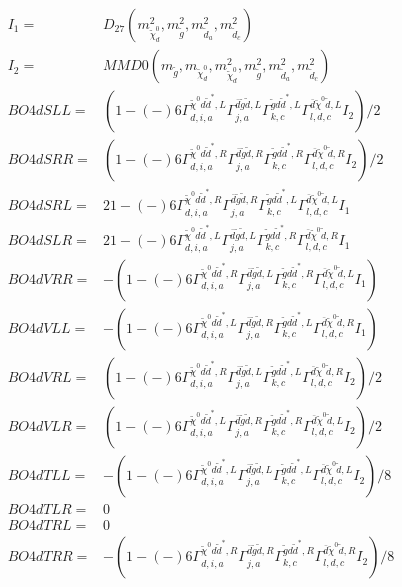 \documentclass[A4,landscape]{article}
\begin{document}
\begin{align} 
I_1 = & D_{27}(m^2_{\tilde{\chi}^0_{{d}}}, m^2_{\tilde{g}}, m^2_{\tilde{d}_{{a}}}, m^2_{\tilde{d}_{{c}}}) \\ 
I_2 = & MMD0(m_{\tilde{g}}, m_{\tilde{\chi}^0_{{d}}}, m^2_{\tilde{\chi}^0_{{d}}}, m^2_{\tilde{g}}, m^2_{\tilde{d}_{{a}}}, m^2_{\tilde{d}_{{c}}}) \\ 
  BO4dSLL= & (  1
-(-)
  6 \Gamma^{\tilde{\chi}^0 d \tilde{d}^*,L}_{d, i, a} \Gamma^{\bar{d}\tilde{g} \tilde{d} ,L}_{j, a} \Gamma^{\tilde{g} d \tilde{d}^*,L}_{k, c} \Gamma^{\bar{d}\tilde{\chi}^0 \tilde{d} ,L}_{l, d, c} I_2)/2 \\ 
  BO4dSRR= & (  1
-(-)
  6 \Gamma^{\tilde{\chi}^0 d \tilde{d}^*,R}_{d, i, a} \Gamma^{\bar{d}\tilde{g} \tilde{d} ,R}_{j, a} \Gamma^{\tilde{g} d \tilde{d}^*,R}_{k, c} \Gamma^{\bar{d}\tilde{\chi}^0 \tilde{d} ,R}_{l, d, c} I_2)/2 \\ 
  BO4dSRL= & 2   1
-(-)
  6 \Gamma^{\tilde{\chi}^0 d \tilde{d}^*,R}_{d, i, a} \Gamma^{\bar{d}\tilde{g} \tilde{d} ,R}_{j, a} \Gamma^{\tilde{g} d \tilde{d}^*,L}_{k, c} \Gamma^{\bar{d}\tilde{\chi}^0 \tilde{d} ,L}_{l, d, c} I_1 \\ 
  BO4dSLR= & 2   1
-(-)
  6 \Gamma^{\tilde{\chi}^0 d \tilde{d}^*,L}_{d, i, a} \Gamma^{\bar{d}\tilde{g} \tilde{d} ,L}_{j, a} \Gamma^{\tilde{g} d \tilde{d}^*,R}_{k, c} \Gamma^{\bar{d}\tilde{\chi}^0 \tilde{d} ,R}_{l, d, c} I_1 \\ 
  BO4dVRR= & -(  1
-(-)
  6 \Gamma^{\tilde{\chi}^0 d \tilde{d}^*,R}_{d, i, a} \Gamma^{\bar{d}\tilde{g} \tilde{d} ,L}_{j, a} \Gamma^{\tilde{g} d \tilde{d}^*,R}_{k, c} \Gamma^{\bar{d}\tilde{\chi}^0 \tilde{d} ,L}_{l, d, c} I_1) \\ 
  BO4dVLL= & -(  1
-(-)
  6 \Gamma^{\tilde{\chi}^0 d \tilde{d}^*,L}_{d, i, a} \Gamma^{\bar{d}\tilde{g} \tilde{d} ,R}_{j, a} \Gamma^{\tilde{g} d \tilde{d}^*,L}_{k, c} \Gamma^{\bar{d}\tilde{\chi}^0 \tilde{d} ,R}_{l, d, c} I_1) \\ 
  BO4dVRL= & (  1
-(-)
  6 \Gamma^{\tilde{\chi}^0 d \tilde{d}^*,R}_{d, i, a} \Gamma^{\bar{d}\tilde{g} \tilde{d} ,L}_{j, a} \Gamma^{\tilde{g} d \tilde{d}^*,L}_{k, c} \Gamma^{\bar{d}\tilde{\chi}^0 \tilde{d} ,R}_{l, d, c} I_2)/2 \\ 
  BO4dVLR= & (  1
-(-)
  6 \Gamma^{\tilde{\chi}^0 d \tilde{d}^*,L}_{d, i, a} \Gamma^{\bar{d}\tilde{g} \tilde{d} ,R}_{j, a} \Gamma^{\tilde{g} d \tilde{d}^*,R}_{k, c} \Gamma^{\bar{d}\tilde{\chi}^0 \tilde{d} ,L}_{l, d, c} I_2)/2 \\ 
  BO4dTLL= & -(  1
-(-)
  6 \Gamma^{\tilde{\chi}^0 d \tilde{d}^*,L}_{d, i, a} \Gamma^{\bar{d}\tilde{g} \tilde{d} ,L}_{j, a} \Gamma^{\tilde{g} d \tilde{d}^*,L}_{k, c} \Gamma^{\bar{d}\tilde{\chi}^0 \tilde{d} ,L}_{l, d, c} I_2)/8 \\ 
  BO4dTLR= & 0 \\ 
  BO4dTRL= & 0 \\ 
  BO4dTRR= & -(  1
-(-)
  6 \Gamma^{\tilde{\chi}^0 d \tilde{d}^*,R}_{d, i, a} \Gamma^{\bar{d}\tilde{g} \tilde{d} ,R}_{j, a} \Gamma^{\tilde{g} d \tilde{d}^*,R}_{k, c} \Gamma^{\bar{d}\tilde{\chi}^0 \tilde{d} ,R}_{l, d, c} I_2)/8 \\ 
\end{align} 
\end{document}

